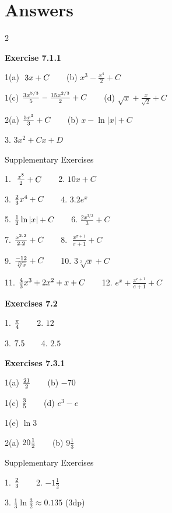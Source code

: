 \section{Answers}
\columnsep =30pt
\begin {multicols}{2}
 

\textbf{Exercise 7.1.1} 

1(a) $\;3 x +C\text{\quad \quad }$(b) $x^{3} -\frac{x^{4}}{2} +C$ 

1(c) $\frac{3 x^{5/3}}{5} -\frac{15 x^{2/3}}{2} +C\text{\quad \quad }$(d) $\sqrt{x} +\frac{x}{\sqrt{2}} +C$ 

2(a) $\frac{5 x^{3}}{3} +C\text{\quad \quad }$(b) $x -\ln  \left \vert x\right \vert  +C$ 

3. $3 x^{2} +C x +D$ 

Supplementary Exercises 

1. $\;\frac{x^{8}}{2} +C\text{\quad \quad }$2. $10 x +C$ 

3. $\frac{2}{3} x^{4} +C\text{\quad \quad }$4. $3.2 e^{x}$ 

5. $\frac{1}{2} \ln  \left \vert x\right \vert  +C\text{\quad \quad }$6. $\frac{2 x^{3/2}}{3} +C$ 

7. $\frac{x^{2.2}}{2.2} +C\text{\quad \quad }$8. $\;\frac{x^{\pi  +1}}{\pi  +1} +C$ 

9. $\frac{ -12}{\sqrt[{3}]{x}} +C\text{\quad \quad }$10. $3 \sqrt[{3}]{x} +C$ 

11. $\frac{4}{3} x^{3} +2 x^{2} +x +C\text{\quad \quad }$12. $e^{x} +\frac{x^{e +1}}{e +1} +C$ 

\textbf{Exercises 7.2} 

1. $\frac{\pi }{4}\text{\quad \quad }$2. $12$ 

3. $7.5\text{\quad \quad }$4. $2.5$ 

\textbf{Exercises 7.3.1} 

1(a) $\frac{21}{2}\text{\quad \quad }$(b) $ -70$ 

1(c) $\frac{3}{5}\text{\quad \quad }$(d) $e^{3} -e$ 

1(e) $\ln  3$ 

2(a) $20\frac{1}{2}\text{\quad \quad }$(b) $9\frac{1}{3}$ 

Supplementary Exercises 

1. $\frac{2}{3}\text{\quad \quad }$2. $ -1\frac{1}{2}$ 

3. $\frac{1}{3} \ln  \frac{3}{2} \approx 0.135$ (3dp) 


\end{multicols}
